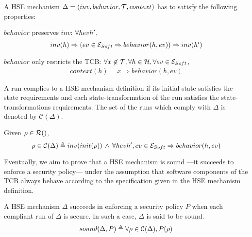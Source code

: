   \begin{definition}
    \label{def:laws}
    A HSE mechanism $\Delta = (inv, behavior, \mathcal{T}, context)$ has to satisfy
    the following properties:
    \begin{compactenum}
    \item $behavior$ preserves $inv$: $\forall \transitionLTS{Ez}{h}{ev}{h'}$,
      \[ \begin{array}{l} inv(h) \Rightarrow (ev \in \mathcal{E}_{Soft} \Rightarrow
          behavior(h,ev)) \Rightarrow inv(h')
         \end{array}
       \]
     \item $behavior$ only restricts the TCB:
       $\forall x \not\in \mathcal{T}, \forall h \in \mathcal{H}, \forall ev \in
       \mathcal{E}_{Soft}$,
       \[
         \begin{array}{l}
           context(h) = x \Rightarrow behavior(h, ev)
         \end{array}
       \]
     \end{compactenum}
   \end{definition}

   A run complies to a HSE mechanism definition if its initial state satisfies
   the state requirements and each state-transformation of the run satisfies the
   state-transformations requirements. The set of the runs which comply with
   $\Delta$ is denoted by $\mathcal{C}(\Delta)$.

\begin{definition}
  Given $\rho \in \pathesLTS{Ez}$,
  \[ \rho \in \mathcal{C}(\Delta) \triangleq inv(init(\rho))\,\wedge\,\forall
    \transitionLTS{Ez}{h}{ev}{h'}, ev \in \set{E}_{Soft} \Rightarrow
    behavior(h,ev) \]
\end{definition}

Eventually, we aim to prove that a HSE mechanism is sound \mbox{---it} succeeds
to enforce a security policy--- under the assumption that software components of
the TCB always behave according to the specification given in the HSE mechanism
definition.

\begin{definition}
  \label{def:sound}
  A HSE mechanism $\Delta$ succeeds in enforcing a security policy $P$ when each
  compliant run of $\Delta$ is secure. In such a case, $\Delta$ is said to be
  sound.
  \[ sound(\Delta, P) \triangleq \forall \rho \in \mathcal{C}(\Delta), P(\rho)
  \]
\end{definition}

